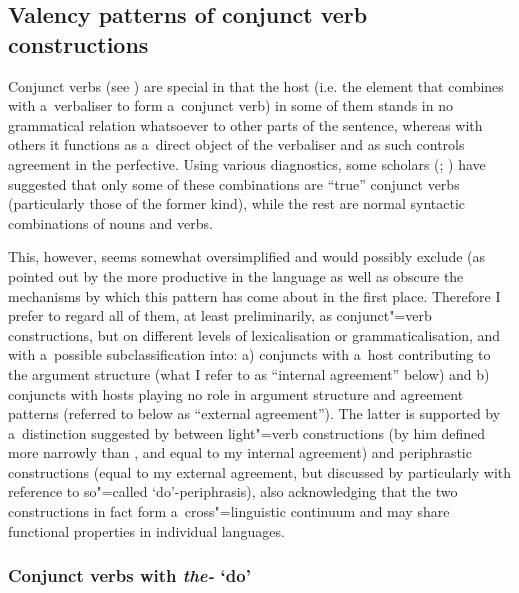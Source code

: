 \subsection{Valency patterns of conjunct verb constructions}
\label{subsec:12-2-8}

Conjunct verbs (see ) are special in that the host (i.e. the element that combines with a~verbaliser to form a~conjunct verb) in some of them stands in no grammatical relation whatsoever to other parts of the sentence, whereas with others it functions as a~direct object of the verbaliser and as such controls agreement in the perfective. Using various diagnostics, some scholars (\citealt[201]{verma1993}; \citealt[165]{mohanan1993}) have suggested that only some of these combinations are ``true'' conjunct verbs (particularly those of the former kind), while the rest are normal syntactic combinations of nouns and verbs. 



This, however, seems somewhat oversimplified and would possibly exclude (as pointed out by \citealt[160]{masica1993} the more productive in the language as well as obscure the mechanisms by which this pattern has come about in the first place. Therefore I prefer to regard all of them, at least preliminarily, as conjunct"=verb constructions, but on different levels of lexicalisation or grammaticalisation, and with a~possible subclassification into: a) conjuncts with a~host contributing to the argument structure (what I refer to as ``internal agreement'' below) and b) conjuncts with hosts playing no role in argument structure and agreement patterns (referred to below as ``external agreement''). The latter is supported by a~distinction suggested by \citet[69--74]{jaeger2006} between light"=verb constructions (by him defined more narrowly than \citealt{butt2003}, and equal to my internal agreement) and periphrastic constructions (equal to my external agreement, but discussed by \citeauthor{jaeger2006} particularly with reference to so"=called `do'-periphrasis), also acknowledging that the two constructions in fact form a~cross"=linguistic continuum and may share functional properties in individual languages. 



\subsubsection*{Conjunct verbs with \textit{the-} `do'}

